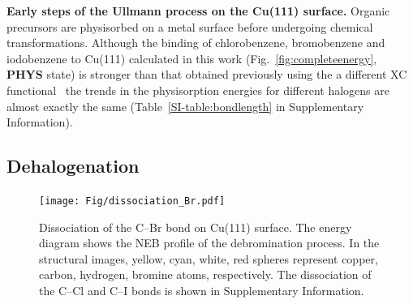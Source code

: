 \documentclass[%
 reprint,
 amsmath,amssymb,
 aps,
prb,
floatfix,
]{revtex4-2}
\newcommand{\lock}{\color{red}}
\newcommand{\lock}{\color{black}}
\newcommand{\comm}{\color{ForestGreen}} %
\newcommand{\sinfo}{Supplementary Information}
\begin{document}
{\lock

\textbf{Early steps of the Ullmann process on the Cu(111) surface.} Organic precursors are physisorbed on a metal surface before undergoing chemical transformations. 
Although the binding of chlorobenzene, bromobenzene and iodobenzene to Cu(111) calculated in this work (Fig.~\ref{fig:completeenergy}, \textbf{PHYS} state) is stronger than that obtained previously using the a different XC functional~\cite{jacs2013} the trends in the physisorption energies for different halogens are almost exactly the same (Table~\ref{SI-table:bondlength} in \sinfo).
}

\ifdefined\INTERNAL
\subsection{Dehalogenation}
\fi

\begin{figure}[hbt]
\centering
\texttt{[image: Fig/dissociation\_Br.pdf]}
\caption{Dissociation of the C--Br bond on Cu(111) surface. The energy diagram shows the NEB profile of the debromination process. In the structural images, yellow, cyan, white, red spheres represent copper, carbon, hydrogen, bromine atoms, respectively. The dissociation of the C--Cl and C--I bonds is shown in \sinfo.
}
\label{fig:dissociation_Br}
\end{figure}
\end{document}
